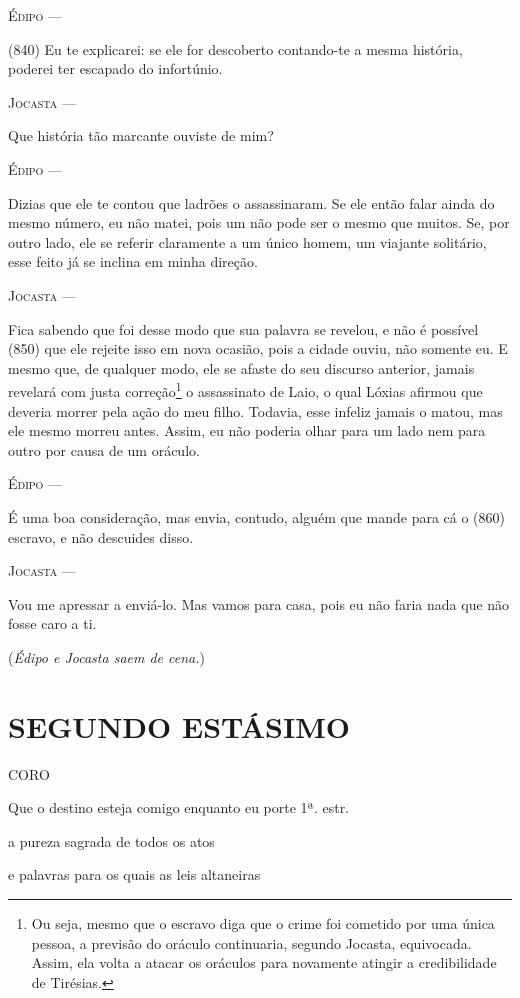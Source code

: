 \textsc{Édipo} ---

(840) Eu te explicarei: se ele for descoberto contando-te a mesma
história, poderei ter escapado do infortúnio.

\textsc{Jocasta} ---

Que história tão marcante ouviste de mim?

\textsc{Édipo} ---

Dizias que ele te contou que ladrões o assassinaram. Se ele então falar
ainda do mesmo número, eu não matei, pois um não pode ser o mesmo que
muitos. Se, por outro lado, ele se referir claramente a um único homem,
um viajante solitário, esse feito já se inclina em minha direção.

\textsc{Jocasta} ---

Fica sabendo que foi desse modo que sua palavra se revelou, e não é
possível (850) que ele rejeite isso em nova ocasião, pois a cidade
ouviu, não somente eu. E mesmo que, de qualquer modo, ele se afaste do
seu discurso anterior, jamais revelará com justa correção\footnote{Ou
  seja, mesmo que o escravo diga que o crime foi cometido por uma única
  pessoa, a previsão do oráculo continuaria, segundo Jocasta,
  equivocada. Assim, ela volta a atacar os oráculos para novamente
  atingir a credibilidade de Tirésias.} o assassinato de Laio, o qual
Lóxias afirmou que deveria morrer pela ação do meu filho. Todavia, esse
infeliz jamais o matou, mas ele mesmo morreu antes. Assim, eu não
poderia olhar para um lado nem para outro por causa de um oráculo.

\textsc{Édipo} ---

É uma boa consideração, mas envia, contudo, alguém que mande para cá o
(860) escravo, e não descuides disso.

\textsc{Jocasta} ---

Vou me apressar a enviá-lo. Mas vamos para casa, pois eu não faria nada
que não fosse caro a ti.

(\emph{Édipo e Jocasta saem de cena.})

\section{SEGUNDO ESTÁSIMO}

\textsc{CORO}

Que o destino esteja comigo enquanto eu porte 1ª. estr.

a pureza sagrada de todos os atos

e palavras para os quais as leis altaneiras


